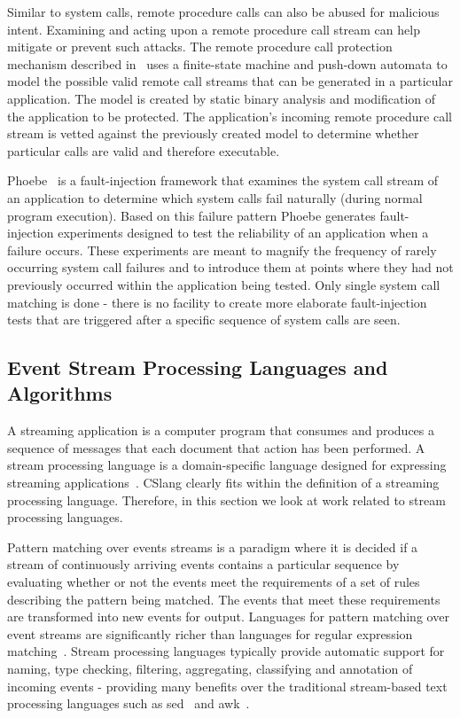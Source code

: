 Similar to system calls, remote procedure calls can also be abused for malicious
intent. Examining and acting upon a remote procedure call stream can help
mitigate or prevent such attacks. The remote procedure call protection mechanism
described in~\cite{DBLP:conf/uss/GiffinJM02} uses a finite-state machine and push-down automata
to model the possible valid remote call streams that can be generated in a
particular application. The model is created by static binary analysis
and modification of the application to be protected. The application's incoming
remote procedure call stream is vetted against the previously created model to
determine whether particular calls are valid and therefore
executable.

Phoebe~\cite{DBLP:journals/corr/abs-2006-04444} is a fault-injection framework that examines
the system call stream of an application to determine which system calls fail
naturally (during normal program execution). Based on this failure pattern
Phoebe generates fault-injection experiments designed to test the reliability of
an application when a failure occurs. These experiments are meant to magnify the
frequency of rarely occurring system call failures and to introduce them at
points where they had not previously occurred within the application being
tested. Only single system call matching is done - there is no facility to create
more elaborate fault-injection tests that are triggered after a specific
sequence of system calls are seen.

\subsection{Event Stream Processing Languages and Algorithms}

A streaming application
is a computer program
that consumes and
produces
a sequence of messages that each document that action has been performed.
A stream processing language is a domain-specific language
designed for expressing streaming applications~\cite{DBLP:journals/sigmod/HirzelBBVSV18}. CSlang clearly
fits within the definition of a streaming processing language.
Therefore, in this
section we look at work related to stream processing languages.

Pattern matching
over events streams is a paradigm
where it is decided if a stream of continuously arriving events
contains a particular sequence by evaluating whether or not
the events meet the requirements of a set of rules describing
the pattern being matched.
The events that meet these requirements are
transformed into new events for output.
Languages for pattern matching over event
streams are significantly richer than languages for regular expression
matching~\cite{DBLP:conf/sigmod/AgrawalDGI08}.
Stream processing languages typically provide automatic
support for naming, type checking, filtering, aggregating, classifying and
annotation of incoming events - providing many benefits over the traditional
stream-based text processing languages such as sed~\cite{Mcmahon1979sed} and
awk~\cite{DBLP:journals/spe/AhoKW79}.

